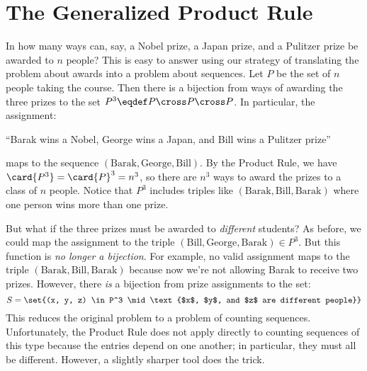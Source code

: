 
\begin{problems}
\practiceproblems
{}

\classproblems
{}
\end{problems}

\section{The Generalized Product Rule}\label{generalized_product_sec}
In how many ways can, say, a Nobel prize, a Japan prize, and a
Pulitzer prize be awarded to $n$ people?  This is easy to answer using
our strategy of translating the problem about awards into a problem
about sequences.  Let $P$ be the set of $n$ people taking the course.
Then there is a bijection from ways of awarding the three prizes to
the set $P^3 \eqdef P \cross P \cross P$.  In particular, the
assignment:
\begin{center}
``Barak wins a Nobel, George wins a Japan, and Bill wins a Pulitzer prize''
\end{center}
maps to the sequence $(\text{Barak}, \text{George}, \text{Bill})$.  By
the Product Rule, we have $\card{P^3}= \card{P}^3 = n^3$, so there are
$n^3$ ways to award the prizes to a class of $n$ people.  Notice that
$P^3$ includes triples like $(\text{Barak}, \text{Bill},
\text{Barak})$ where one person wins more than one prize.

But what if the three prizes must be awarded to \emph{different}
students?  As before, we could map the assignment to the triple
$(\text{Bill}, \text{George}, \text{Barak}) \in P^3$.  But this
function is \emph{no longer a bijection}.  For example, no valid
assignment maps to the triple $(\text{Barak}, \text{Bill},
\text{Barak})$ because now we're not allowing Barak to receive two
prizes.  However, there \emph{is} a bijection from prize assignments to
the set:
\[
S = \set{(x, y, z) \in P^3 \mid \text{$x$, $y$, and $z$ are different people}}
\]
This reduces the original problem to a problem of counting sequences.
Unfortunately, the Product Rule does not apply directly to counting
sequences of this type because the entries depend on one another; in
particular, they must all be different.  However, a slightly sharper
tool does the trick.

